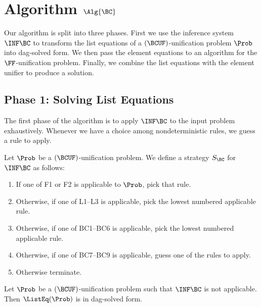 \section{Algorithm $\Alg{\BC}$}\label{sec:bc-algorithm}

Our algorithm is split into three phases. First we use the inference system
$\INF\BC$ to transform the list equations of a $(\BCUF)$-unification problem
$\Prob$ into dag-solved form. We then pass the element equations to an
algorithm for the $\FF$-unification problem. Finally, we combine the list
equations with the element unifier to produce a solution.

\subsection{Phase 1: Solving List Equations}

The first phase of the algorithm is to apply $\INF\BC$ to the input problem
exhaustively. Whenever we have a choice among nondeterministic rules, we
guess a rule to apply.

\begin{Definition}
    Let $\Prob$ be a $(\BCUF)$-unification problem. We define a strategy
    $S_\BC$ for $\INF\BC$ as follows:
    \begin{enumerate}[(1)]
        \item If one of F1 or F2 is applicable to $\Prob$, pick that rule.
        \item Otherwise, if one of L1--L3 is applicable, pick the lowest
            numbered applicable rule.
        \item Otherwise, if one of BC1--BC6 is applicable, pick the lowest
            numbered applicable rule.
        \item Otherwise, if one of BC7--BC9 is applicable, guess one of
            the rules to apply.
        \item Otherwise terminate.
    \end{enumerate}
\end{Definition}

\begin{Lemma}
    Let $\Prob$ be a $(\BCUF)$-unification problem such that $\INF\BC$ is
    not applicable. Then $\ListEq(\Prob)$ is in dag-solved form.
\end{Lemma}

